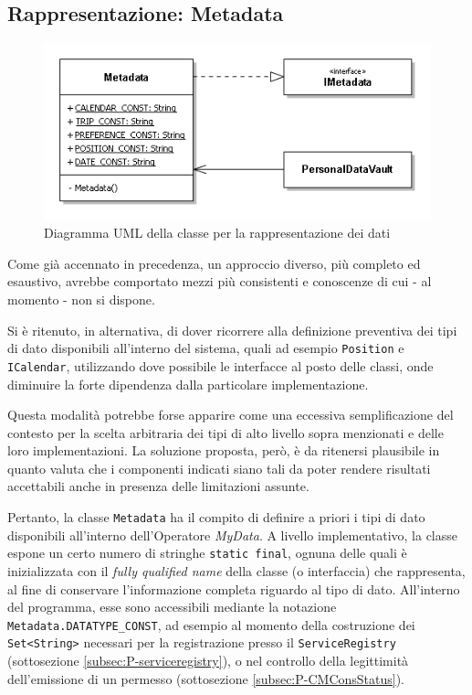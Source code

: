 \subsection{Rappresentazione: Metadata}
\label{subsec:P-metadata}
\begin{figure} [h]
	\centering
	\includegraphics[width=0.7\linewidth]{pictures/Metadata.png}
	\caption{Diagramma UML della classe per la rappresentazione dei dati}
	\label{fig:Metadata}
\end{figure}
Come già accennato in precedenza, un approccio diverso, più completo ed esaustivo, avrebbe comportato mezzi più consistenti e conoscenze di cui - al momento - non si dispone.

Si è ritenuto, in alternativa, di dover ricorrere alla definizione preventiva dei tipi di dato disponibili all’interno del sistema, quali ad esempio \texttt{Position} e \texttt{ICalendar}, utilizzando dove possibile le interfacce al posto delle classi, onde diminuire la forte dipendenza dalla particolare implementazione.

Questa modalità potrebbe forse apparire come una eccessiva semplificazione del contesto per la scelta arbitraria dei tipi di alto livello sopra menzionati e delle loro implementazioni. La soluzione proposta, però, è da ritenersi plausibile in quanto valuta che i componenti indicati siano tali da poter rendere risultati accettabili anche in presenza delle limitazioni assunte.

Pertanto, la classe \texttt{Metadata} ha il compito di definire a priori i tipi di dato disponibili all’interno dell’Operatore \textit{MyData}. A livello implementativo, la classe espone un certo numero di stringhe \texttt{static final}, ognuna delle quali è inizializzata con il \textit{fully qualified name} della classe (o interfaccia) che rappresenta, al fine di conservare l’informazione completa riguardo al tipo di dato. All’interno del programma, esse sono accessibili mediante la notazione \texttt{Metadata.DATATYPE\_CONST}, ad esempio al momento della costruzione dei \texttt{Set<String>} necessari per la registrazione presso il \texttt{ServiceRegistry} (sottosezione \ref{subsec:P-serviceregistry}), o nel controllo della legittimità dell’emissione di un permesso (sottosezione \ref{subsec:P-CMConsStatus}).

